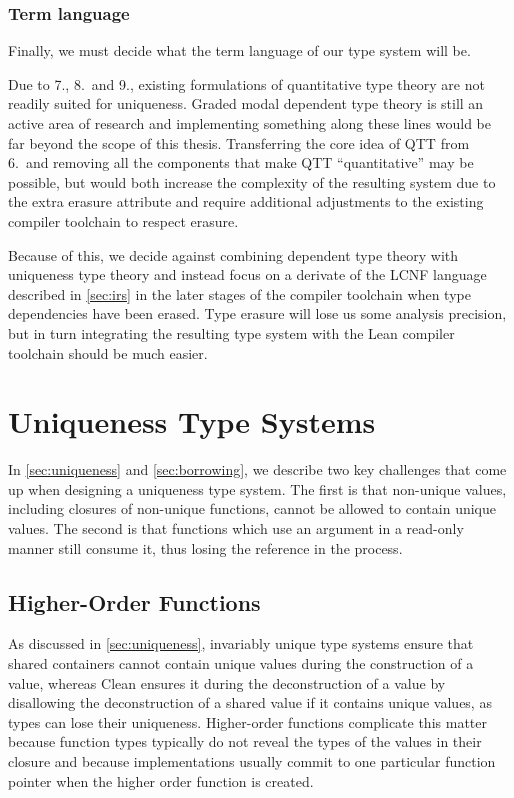 \subsubsection{Term language}
Finally, we must decide what the term language of our type system will be. 

Due to 7., 8.\ and 9., existing formulations of quantitative type theory are not readily suited for uniqueness. Graded modal dependent type theory \citep{moon_graded_2021} is still an active area of research and implementing something along these lines would be far beyond the scope of this thesis. Transferring the core idea of QTT from 6.\ and removing all the components that make QTT ``quantitative'' may be possible, but would both increase the complexity of the resulting system due to the extra erasure attribute and require additional adjustments to the existing compiler toolchain to respect erasure. 

Because of this, we decide against combining dependent type theory with uniqueness type theory and instead focus on a derivate of the LCNF language described in \cref{sec:irs} in the later stages of the compiler toolchain when type dependencies have been erased. Type erasure will lose us some analysis precision, but in turn integrating the resulting type system with the Lean compiler toolchain should be much easier.

\section{Uniqueness Type Systems}
In \cref{sec:uniqueness} and \cref{sec:borrowing}, we describe two key challenges that come up when designing a uniqueness type system. The first is that non-unique values, including closures of non-unique functions, cannot be allowed to contain unique values. The second is that functions which use an argument in a read-only manner still consume it, thus losing the reference in the process.

\subsection{Higher-Order Functions}\label{sec:hof}
As discussed in \cref{sec:uniqueness}, invariably unique type systems ensure that shared containers cannot contain unique values during the construction of a value, whereas Clean ensures it during the deconstruction of a value by disallowing the deconstruction of a shared value if it contains unique values, as types can lose their uniqueness. Higher-order functions complicate this matter because function types typically do not reveal the types of the values in their closure and because implementations usually commit to one particular function pointer when the higher order function is created. 

